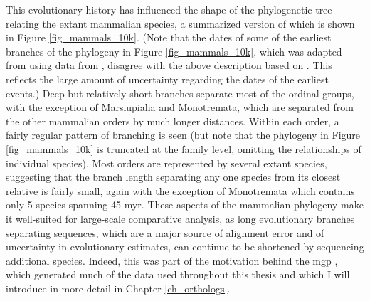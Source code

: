 This evolutionary history has influenced the shape of the phylogenetic
tree relating the extant mammalian species, a summarized version of
which is shown in Figure \ref{fig_mammals_10k}. (Note that the dates
of some of the earliest branches of the phylogeny in Figure
\ref{fig_mammals_10k}, which was adapted from \citet{Haussler2009}
using data from \citet{Hedges2009}, disagree with the above
description based on \citet{BinindaEmonds2007}. This reflects the
large amount of uncertainty regarding the dates of the earliest
events.) Deep but relatively short branches separate most of the
ordinal groups, with the exception of Marsiupialia and Monotremata,
which are separated from the other mammalian orders by much longer
distances. Within each order, a fairly regular pattern of branching is
seen (but note that the phylogeny in Figure \ref{fig_mammals_10k} is
truncated at the family level, omitting the relationships of
individual species). Most orders are represented by several extant
species, suggesting that the branch length separating any one species
from its closest relative is fairly small, again with the exception of
Monotremata which contains only 5 species spanning 45 \ac{myr}. These
aspects of the mammalian phylogeny make it well-suited for large-scale
comparative analysis, as long evolutionary branches separating
sequences, which are a major source of alignment error and of
uncertainty in evolutionary estimates, can continue to be shortened by
sequencing additional species. Indeed, this was part of the motivation
behind the \ac{mgp} \citep{LindbladToh2011}, which generated much of
the data used throughout this thesis and which I will introduce in
more detail in Chapter \ref{ch_orthologs}.

